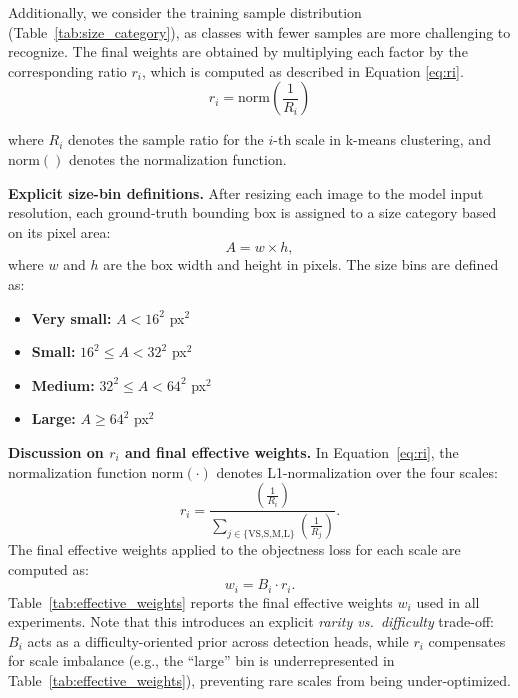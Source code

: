 \documentclass[preprint,review,12pt]{elsarticle}
\begin{document}
Additionally, we consider the training sample distribution (Table~\ref{tab:size_category}), as classes with fewer samples are more challenging to recognize. The final weights are obtained by multiplying each factor by the corresponding ratio \( r_i \), which is computed as described in Equation \eqref{eq:ri}.
\begin{equation}
r_i = \text{norm}\left(\frac{1}{R_i}\right)
\label{eq:ri}
\end{equation}

where \( R_i \) denotes the sample ratio for the \( i \)-th scale in k-means clustering, and \( \text{norm}() \) denotes the normalization function.

\begin{highlightbox}

\vspace{0.5ex}
\noindent\textbf{Explicit size-bin definitions.}
After resizing each image to the model input resolution, each ground-truth bounding box is assigned to a size category based on its pixel area:
\begin{equation}
A = w \times h,
\label{eq:area_def}
\end{equation}
where \(w\) and \(h\) are the box width and height in pixels. The size bins are defined as:
\begin{itemize}
    \item \textbf{Very small:} \(A < 16^2\) px\(^2\)
    \item \textbf{Small:} \(16^2 \le A < 32^2\) px\(^2\)
    \item \textbf{Medium:} \(32^2 \le A < 64^2\) px\(^2\)
    \item \textbf{Large:} \(A \ge 64^2\) px\(^2\)
\end{itemize}

\vspace{0.5ex}
\noindent\textbf{Discussion on \(r_i\) and final effective weights.}
In Equation~\eqref{eq:ri}, the normalization function \(\text{norm}(\cdot)\) denotes L1-normalization over the four scales:
\begin{equation}
r_i = \frac{\left(\frac{1}{R_i}\right)}{\sum_{j \in \{\text{VS,S,M,L}\}}\left(\frac{1}{R_j}\right)}.
\label{eq:ri_l1}
\end{equation}
The final effective weights applied to the objectness loss for each scale are computed as:
\begin{equation}
w_i = B_i \cdot r_i.
\label{eq:wi}
\end{equation}
Table~\ref{tab:effective_weights} reports the final effective weights \(w_i\) used in all experiments. Note that this introduces an explicit \emph{rarity vs.\ difficulty} trade-off: \(B_i\) acts as a difficulty-oriented prior across detection heads, while \(r_i\) compensates for scale imbalance (e.g., the ``large'' bin is underrepresented in Table~\ref{tab:effective_weights}), preventing rare scales from being under-optimized.

\end{highlightbox}
\end{document}
